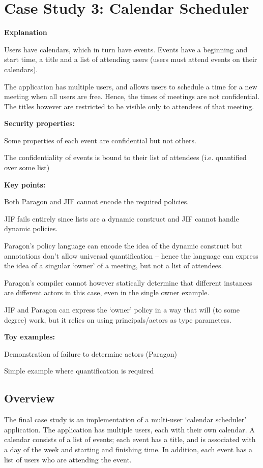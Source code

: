 \section{Case Study 3: Calendar Scheduler}

\textbf{Explanation}

Users have calendars, which in turn have events. Events have a beginning and start time, a title and a list of attending users (users must attend events on their calendars).

The application has multiple users, and allows users to schedule a time for a new meeting when all users are free. Hence, the times of meetings are not confidential. The titles however are restricted to be visible only to attendees of that meeting.

\textbf{Security properties:}

Some properties of each event are confidential but not others.

The confidentiality of events is bound to their list of attendees (i.e. quantified over some list)

\textbf{Key points:}

Both Paragon and JIF cannot encode the required policies.

JIF fails entirely since lists are a dynamic construct and JIF cannot handle dynamic policies.

Paragon's policy language can encode the idea of the dynamic construct but annotations don't allow universal quantification -- hence the language can express the idea of a singular `owner' of a meeting, but not a list of attendees.

Paragon's compiler cannot however statically determine that different instances are different actors in this case, even in the single owner example.

JIF and Paragon can express the `owner' policy in a way that will (to some degree) work, but it relies on using principals/actors as type parameters.

\textbf{Toy examples:}

Demonstration of failure to determine actors (Paragon)

Simple example where quantification is required

\newpage

\subsection{Overview}

The final case study is an implementation of a multi-user `calendar scheduler' application. The application has multiple users, each with their own calendar. A calendar consists of a list of events; each event has a title, and is associated with a day of the week and starting and finishing time. In addition, each event has a list of users who are attending the event.

